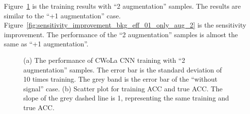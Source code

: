 \documentclass[12pt]{article}
\begin{document}
        Figure~\ref{fig:cwola_cnn_training_performance_only_aug_2} is the training results with ``2 augmentation'' samples. The results are similar to the ``+1 augmentation'' case. Figure~\ref{fig:sensitivity_improvement_bkg_eff_01_only_aug_2} is the sensitivity improvement. The performance of the ``2 augmentation'' samples is almost the same as ``+1 augmentation''.
        \begin{figure}[htpb]
            \centering
            \caption{(a) The performance of CWoLa CNN training with ``2 augmentation'' samples. The error bar is the standard deviation of 10 times training. The grey band is the error bar of the ``without signal'' case. (b) Scatter plot for training ACC and true ACC. The slope of the grey dashed line is 1, representing the same training and true ACC.}
            \label{fig:cwola_cnn_training_performance_only_aug_2}
        \end{figure}
\end{document}
